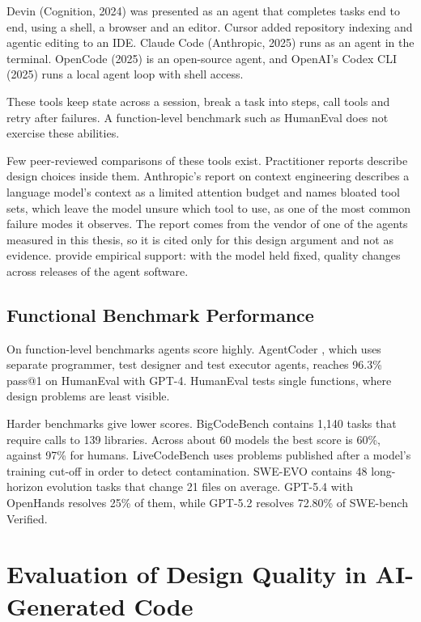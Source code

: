 Devin (Cognition, 2024) was presented as an agent that completes tasks end to end, using a shell, a
browser and an editor. Cursor added repository indexing and agentic editing to an IDE. Claude Code
(Anthropic, 2025) runs as an agent in the terminal. OpenCode (2025) is an open-source agent, and
OpenAI's Codex CLI (2025) runs a local agent loop with shell access.

These tools keep state across a session, break a task into steps, call tools and retry after
failures. A function-level benchmark such as HumanEval does not exercise these abilities.

Few peer-reviewed comparisons of these tools exist. Practitioner reports describe design choices
inside them. Anthropic's report on context engineering \citep{anthropic2025context} describes a
language model's context as a limited attention budget and names bloated tool sets, which leave the
model unsure which tool to use, as one of the most common failure modes it observes. The report
comes from the vendor of one of the agents measured in this thesis, so it is cited only for this
design argument and not as evidence. \citet{bensghaier2026harness} provide empirical support: with
the model held fixed, quality changes across releases of the agent software.

\subsection{Functional Benchmark Performance}

On function-level benchmarks agents score highly. AgentCoder \citep{huang2023agentcoder}, which
uses separate programmer, test designer and test executor agents, reaches 96.3\% pass@1 on
HumanEval with GPT-4. HumanEval tests single functions, where design problems are least visible.

Harder benchmarks give lower scores. BigCodeBench \citep{zhuo2024bigcodebench} contains 1,140 tasks
that require calls to 139 libraries. Across about 60 models the best score is 60\%, against 97\% for
humans. LiveCodeBench \citep{jain2024livecodebench} uses problems published after a model's
training cut-off in order to detect contamination. SWE-EVO \citep{sweevo2025} contains 48
long-horizon evolution tasks that change 21 files on average. GPT-5.4 with OpenHands resolves 25\%
of them, while GPT-5.2 resolves 72.80\% of SWE-bench Verified.

\section{Evaluation of Design Quality in AI-Generated Code}
\label{sec:evaluation-review}

